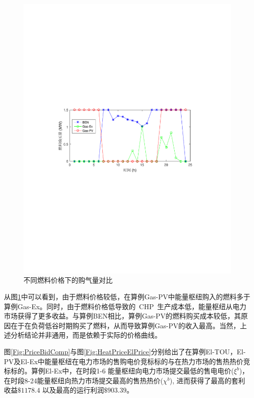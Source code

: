 \begin{figure}[!htp]
\centering
\includegraphics[scale=0.75]{figures/Chap4-12-GasIn_GasPrice.pdf}
\caption{不同燃料价格下的购气量对比}
\label{Fig:GasInGasPrice}
\end{figure}

从图\ref{Fig:GasInGasPrice}中可以看到，由于燃料价格较低，在算例{Gas-PV}中能量枢纽购入的燃料多于算例{Gas-Ex}。同时，由于燃料价格低导致的~CHP~生产成本低，能量枢纽从电力市场获得了更多收益。与算例{BEN}相比，算例{Gas-PV}的燃料购买成本较低，其原因在于在负荷低谷时期购买了燃料，从而导致算例{Gas-PV}的收入最高。当然，上述分析结论并非通用，而是依赖于实际的价格曲线。

图\ref{Fig:PriceBidComp}与图\ref{Fig:HeatPriceElPrice}分别给出了在算例{El-TOU}，{El-PV}及{El-Ex}中能量枢纽在电力市场的售购电价竞标标的与在热力市场的售热热价竞标标的。算例{El-Ex}中，在时段1-6 能量枢纽向电力市场提交最低的售电电价($\xi^b$)，在时段8-24能量枢纽向热力市场提交最高的售热热价($\chi^b$), 进而获得了最高的套利收益$\$1178.4$ 以及最高的运行利润$\$903.39$。

